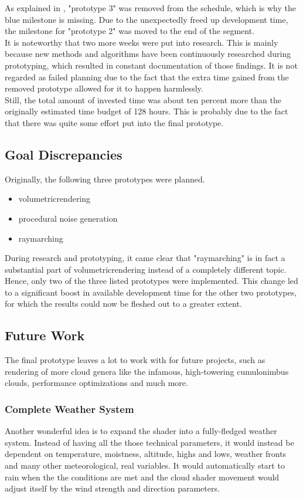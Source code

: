 \vspace{\baselineskip}
\noindent
As explained in , "prototype 3" was removed from the schedule, which is why the blue milestone is missing. Due to the unexpectedly freed up development time, the milestone for "prototype 2" was moved to the end of the segment.
\\
It is noteworthy that two more weeks were put into research. This is mainly because new methods and algorithms have been continuously researched during prototyping, which resulted in constant documentation of those findings.
It is not regarded as failed planning due to the fact that the extra time gained from the removed prototype allowed for it to happen harmlessly.
\\
Still, the total amount of invested time was about ten percent more than the originally estimated time budget of 128 hours. This is probably due to the fact that there was quite some effort put into the final prototype.

\clearpage
\subsection{Goal Discrepancies}
\label{section:projectmanagement:goals}
Originally, the following three prototypes were planned.
\begin{itemize}
    \item \gls{volumetricrendering}
    \item \gls{procedural} \gls{noise} generation
    \item \gls{raymarching}
\end{itemize}
During research and prototyping, it came clear that "\gls{raymarching}" is in fact a substantial part of \gls{volumetricrendering} instead of a completely different topic.
Hence, only two of the three listed prototypes were implemented. This change led to a significant boost in available development time for the other two prototypes, for which the results could now be fleshed out to a greater extent.

\subsection{Future Work}
The final prototype leaves a lot to work with for future projects, such as rendering of more cloud genera like the infamous, high-towering cumulonimbus clouds, performance optimizations and much more.

\subsubsection{Complete Weather System}
Another wonderful idea is to expand the shader into a fully-fledged weather system. Instead of having all the those technical \gls{parameters}, it would instead be dependent on temperature, moistness, altitude, highs and lows, weather fronts and many other meteorological, real variables.
It would automatically start to rain when the the conditions are met and the cloud shader movement would adjust itself by the wind strength and direction \gls{parameters}.

